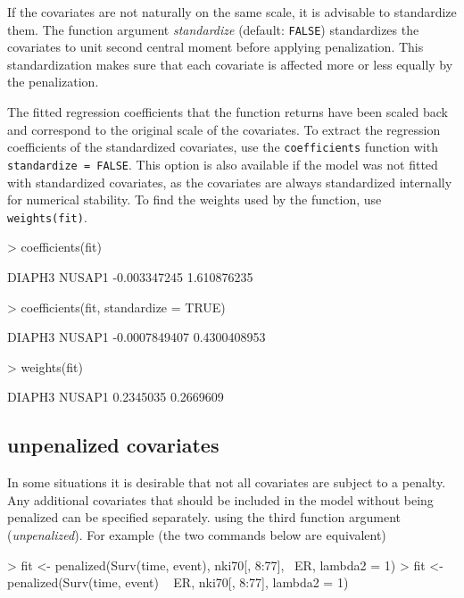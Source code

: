 \documentclass[a4paper]{article}
\newcommand{\Robject}[1]{{\texttt{#1}}}
\newcommand{\Rfunction}[1]{{\texttt{#1}}}
\newcommand{\Rfunarg}[1]{{\textit{#1}}}
\begin{document}
If the covariates are not naturally on the same scale, it is advisable to standardize them. The function argument \Rfunarg{standardize} (default: \Robject{FALSE}) standardizes the covariates to unit second central moment before applying penalization. This standardization makes sure that each covariate is affected more or less equally by the penalization.

The fitted regression coefficients that the function returns have been scaled back and correspond to the original scale of the covariates. To extract the regression coefficients of the standardized covariates, use the \Rfunction{coefficients} function with \Robject{standardize = FALSE}. This option is also available if the model was not fitted with standardized covariates, as the covariates are always standardized internally for numerical stability. To find the weights used by the function, use \Robject{weights(fit)}.

\begin{Schunk}
\begin{Sinput}
> coefficients(fit)
\end{Sinput}
\begin{Soutput}
      DIAPH3       NUSAP1 
-0.003347245  1.610876235 
\end{Soutput}
\begin{Sinput}
> coefficients(fit, standardize = TRUE)
\end{Sinput}
\begin{Soutput}
       DIAPH3        NUSAP1 
-0.0007849407  0.4300408953 
\end{Soutput}
\begin{Sinput}
> weights(fit)
\end{Sinput}
\begin{Soutput}
   DIAPH3    NUSAP1 
0.2345035 0.2669609 
\end{Soutput}
\end{Schunk}


\subsection{unpenalized covariates}

In some situations it is desirable that not all covariates are subject to a penalty. Any additional covariates that should be included in the model without being penalized can be specified separately. using the third function argument (\Rfunarg{unpenalized}). For example (the two commands below are equivalent)

\begin{Schunk}
\begin{Sinput}
> fit <- penalized(Surv(time, event), nki70[, 8:77], ~ER, lambda2 = 1)
> fit <- penalized(Surv(time, event) ~ ER, nki70[, 8:77], lambda2 = 1)
\end{Sinput}
\end{Schunk}
\end{document}
